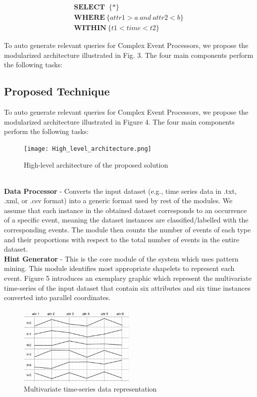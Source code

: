 \documentclass[conference]{IEEEtran}  %
\begin{document}
\begin{equation}
\begin{split}
\textbf{SELECT }\ \{*\} \\ \textbf{WHERE}\ \{attr1>a\ and \ attr2<b\} \\ \textbf{WITHIN}\ \{t1<time<t2\}
\end{split}
\end{equation}

To auto generate relevant queries for Complex Event Processors, we propose the modularized architecture illustrated in Fig. 3. The four main components perform the following tasks:


\subsection{Proposed Technique}
To auto generate relevant queries for Complex Event Processors, we propose the modularized architecture illustrated in Figure 4. The four main components perform the following tasks:
\begin{figure}[h!]
\texttt{[image: High\_level\_architecture.png]}
\caption{High-level architecture of the proposed solution}
\end{figure}
\smallskip\\
\textbf{Data Processor} - Converts the input dataset (e.g., time series data in .txt, .xml, or .csv format) into a generic format used by rest of the modules. We assume that each instance in the obtained dataset corresponds to an occurrence of a specific event, meaning the dataset instances are classified/labelled with the corresponding events. The module then counts  the number of events of each type and their proportions with respect to the total number of events in the entire dataset.
\smallskip\\
\textbf{Hint Generator}	- This is the core module of the system which uses pattern mining. This module identifies most appropriate shapelets to represent each event. Figure 5 introduces an exemplary graphic which represent the multivariate time-series of the input dataset that contain six attributes and six time instances converted into parallel coordinates.

\begin{figure}[h!]
\includegraphics[width=0.5\textwidth]{multivariateTime.png}
\caption{Multivariate time-series data representation}
\end{figure}
\end{document}
